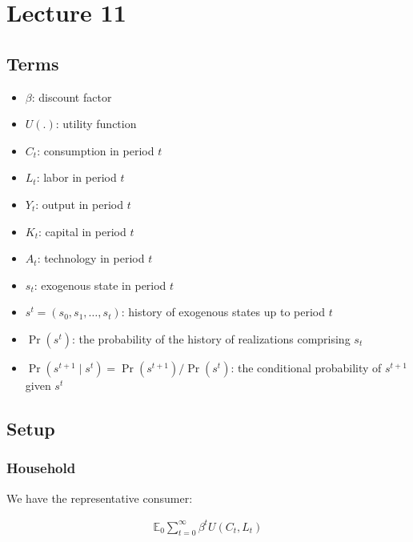 \documentclass[10pt]{article}
\begin{document}

\section{Lecture 11}

\subsection{Terms}

\begin{itemize}
    \item $\beta$: discount factor
    \item $U(.)$: utility function
    \item $C_t$: consumption in period $t$
    \item $L_t$: labor in period $t$
    \item $Y_t$: output in period $t$
    \item $K_t$: capital in period $t$
    \item $A_t$: technology in period $t$
    \item $s_t$: exogenous state in period $t$
    \item $s^t = (s_0, s_1, \ldots, s_t)$: history of exogenous states up to period $t$
    \item $\operatorname{Pr}\left(s^t\right)$: the probability of the history of realizations comprising $s_t$
    \item $\operatorname{Pr}\left(s^{t+1} \mid s^t\right)=\operatorname{Pr}\left(s^{t+1}\right) / \operatorname{Pr}\left(s^t\right)$: the conditional probability of $s^{t+1}$ given $s^t$
\end{itemize}


\subsection{Setup}

\subsubsection{Household}

We have the representative consumer:

\begin{align}
    \mathbb{E}_0 \sum_{t=0}^{\infty} \beta^t U\left(C_t, L_t\right)
\end{align}
\end{document}
